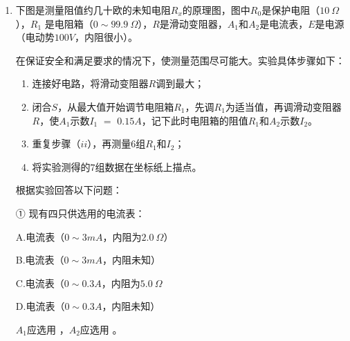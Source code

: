 \begin{enumerate}[leftmargin=0em]
\begin{enumerate}
\end{enumerate}



\newpage

\item 
{}
下图是测量阻值约几十欧的未知电阻$ R_{x} $的原理图，图中$ R_{0} $是保护电阻（$ 10 \ \Omega $），$ R_{1} $ 是电阻箱（$ 0 \sim 99.9 \ \Omega $），$ R $是滑动变阻器，$ A_{1} $和$ A_{2} $是电流表，$ E $是电源（电动势$ 100V $，内阻很小）。
\begin{figure}[h!]
\centering
 \qquad 

\end{figure}


在保证安全和满足要求的情况下，使测量范围尽可能大。实验具体步骤如下：
\begin{enumerate}
\renewcommand{\labelenumii}{(\roman{enumii})}
\item
连接好电路，将滑动变阻器$ R $调到最大；
\item 
闭合$ S $，从最大值开始调节电阻箱$ R_{1} $，先调$ R_{1} $为适当值，再调滑动变阻器$ R $，使$ A_{1} $示数$ I_{1} $ $ = $ $ 0.15A $，记下此时电阻箱的阻值$ R_{1} $和$ A_{2} $示数$ I_{2} $。
\item 
重复步骤（$ ii $），再测量$ 6 $组$ R_{1} $和$ I_{2} $；
\item 
将实验测得的$ 7 $组数据在坐标纸上描点。

\end{enumerate}



根据实验回答以下问题：

① 现有四只供选用的电流表：

A.电流表（$ 0 \sim 3mA $，内阻为$ 2.0 \ \Omega $）

B.电流表（$ 0 \sim 3mA $，内阻未知）

C.电流表（$ 0 \sim 0.3A $，内阻为$ 5.0 \ \Omega $

D.电流表（$ 0 \sim 0.3A $，内阻未知）

$ A_{1} $应选用  ，$ A_{2} $应选用  。


\end{enumerate}
